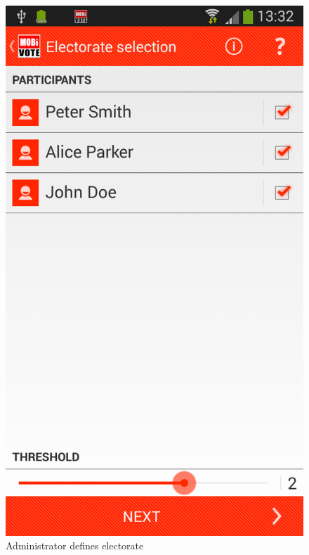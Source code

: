 \documentclass[numbers=noenddot, abstract=on, a4paper, headsepline,
footsepline, oneside, openright, draft=off, listof=leveldown]{scrreprt}
\begin{document}
\begin{figure}[!htb]
	\begin{minipage}{.5\textwidth}
  		\centering
		\includegraphics[height=.4\textheight]{img/screenshots/electorate_selection}
		\caption{Administrator defines electorate}
		\label{fig:handbook_electorateselection}
	\end{minipage}
	\begin{minipage}{.5\textwidth}
  		\centering

\end{minipage}
\end{figure}
\end{document}
